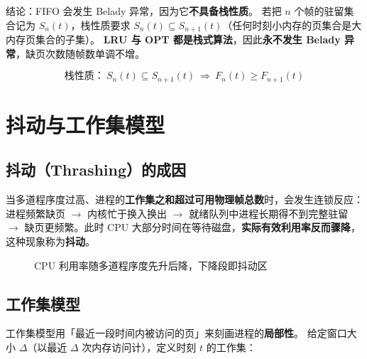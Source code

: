 结论：FIFO 会发生 Belady 异常，因为它\textbf{不具备栈性质}。
若把 $n$ 个帧的驻留集合记为 $S_n(t)$，栈性质要求
$S_n(t)\subseteq S_{n+1}(t)$（任何时刻小内存的页集合是大内存页集合的子集）。
\textbf{LRU 与 OPT 都是栈式算法}，因此\textbf{永不发生 Belady 异常}，缺页次数随帧数单调不增。

\begin{equation}
    \text{栈性质：}\ S_n(t)\subseteq S_{n+1}(t)\ \Longrightarrow\ F_n(t)\ge F_{n+1}(t)
\end{equation}

\section{抖动与工作集模型}

\subsection{抖动（Thrashing）的成因}

当多道程序度过高、进程的\textbf{工作集之和超过可用物理帧总数}时，会发生连锁反应：
进程频繁缺页 $\to$ 内核忙于换入换出 $\to$ 就绪队列中进程长期得不到完整驻留 $\to$
缺页更频繁。此时 CPU 大部分时间在等待磁盘，\textbf{实际有效利用率反而骤降}，
这种现象称为\textbf{抖动}。

\begin{figure}[H]
\centering
{}
\caption{CPU 利用率随多道程序度先升后降，下降段即抖动区}
\end{figure}

\subsection{工作集模型}

工作集模型用「最近一段时间内被访问的页」来刻画进程的\textbf{局部性}。
给定窗口大小 $\Delta$（以最近 $\Delta$ 次内存访问计），定义时刻 $t$ 的工作集：


